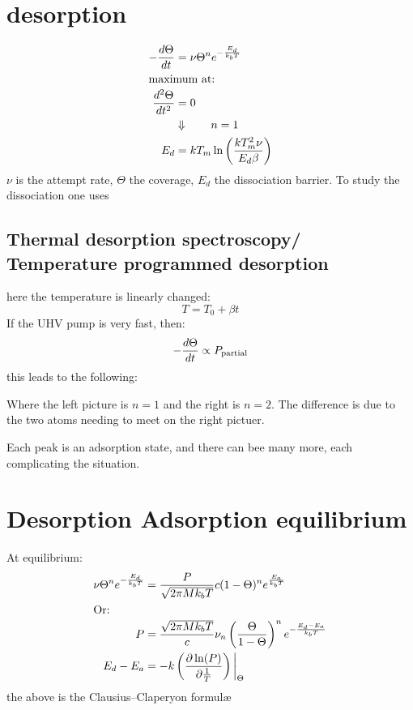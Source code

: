 \documentclass[article,oneside]{memoir}
\begin{document}
\section{desorption}
\begin{align*}
        -\frac{d\Theta}{dt}&=\nu\Theta^ne^{-\frac{E_{d}}{k_{b}T}}\\
        \intertext{maximum at:}
        \frac{d^2\Theta}{dt^2}&=0\\
        &\Downarrow\qquad n=1\\
        E_{d}&=kT_{m}\ln\left(\frac{kT_m^2\nu}{E_d\beta}\right)
\end{align*}
$\nu$ is the attempt rate, $\Theta$ the coverage, $E_{d}$ the dissociation barrier. To study the dissociation one uses
\subsection{Thermal desorption spectroscopy/ Temperature programmed desorption}
here the temperature is linearly changed:
\begin{equation*}
        T=T_0+\beta t
\end{equation*}
If the UHV pump is very fast, then:
\begin{equation*}
        -\frac{d\Theta}{dt}\propto P_{\textup{partial}}
\end{equation*}
this leads to the following:


Where the left picture is $n=1$ and the right is $n=2$. The difference is due to the two atoms needing to meet on the right pictuer.


Each peak is an adsorption state, and there can bee many more, each complicating the situation.
\section{Desorption Adsorption equilibrium}
At equilibrium:
\begin{align*}
         \nu\Theta^ne^{-\frac{E_{d}}{k_{b}T}}  &=      \frac{P}{\sqrt{2\pi Mk_{b}T} }c(1-\Theta)^ne^{\frac{E_{a}}{k_{b}T}}  \\
        \intertext{Or:}
        P&=  \frac{\sqrt{2\pi Mk_{b}T}}{c}\nu_n\left(\frac{\Theta}{1-\Theta}\right)^ne^{-\frac{E_{d}-E_{a}}{k_{b}T}}\\
        E_{d}-E_{a}&=-k\left(\frac{\partial \ln(P)}{\partial \frac{1}{T}}\right)\bigg\vert_{\Theta}
\end{align*}
the above is the Clausius--Claperyon formulæ
\end{document}
